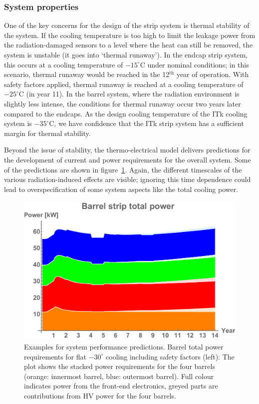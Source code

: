 \subsubsection{System properties}
One of the key concerns for the design of the strip system is thermal stability of the system. If the cooling temperature is too high to limit the leakage power from the radiation-damaged sensors to a level where the heat can still be removed, the system is unstable (it goes into `thermal runaway').
In the endcap strip system, this occurs at a cooling temperature of $-15^\circ$C under nominal conditions; in this scenario, thermal runaway would be reached in the 12$^\text{th}$ year of operation. With safety factors applied, thermal runaway is reached at a cooling temperature of $-25^\circ$C (in year 11).
In the barrel system, where the radiation environment is slightly less intense, the conditions for thermal runaway occur two years later compared to the endcaps.
As the design cooling temperature of the ITk cooling system is $-35^\circ$C, we have confidence that the ITk strip system has a sufficient margin for thermal stability.

Beyond the issue of stability, the thermo-electrical model delivers predictions for the development of current and power requirements for the overall system. Some of the predictions are shown in figure~\ref{fig:systemperformance}. Again, the different timescales of the various radiation-induced effects are visible; ignoring this time dependence could lead to overspecification of some system aspects like the total cooling power.

\begin{figure}[ht]
\centering
\includegraphics[width=0.4\linewidth]{figures/Totalbarrelpower-30.pdf}
\caption{Examples for system performance predictions. Barrel total power requirements for flat $-30^\circ$ cooling including safety factors (left): The plot shows the stacked power requirements for the four barrels (orange: innermost barrel, blue: outermost barrel). Full colour indicates power from the front-end electronics, greyed parts are contributions from HV power for the four barrels.}
\label{fig:systemperformance}
\end{figure}

